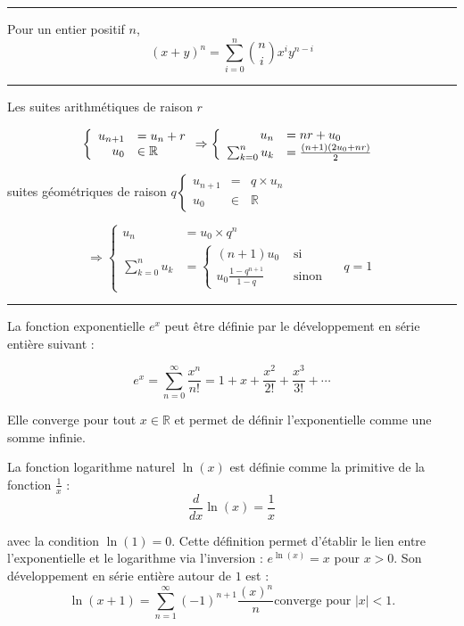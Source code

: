 \hrule
\begin{f}
	
	Pour un entier positif \(n\),
	\[
	(x+y)^n=\sum_{i=0}^n\binom{n}{i} x^i y^{n-i}
	\]
	
\end{f}
\hrule
\begin{f}[Suites]  
	
	Les suites arithmétiques de raison \(r\)
	
	\[
	\left\{\begin{array} { r l } 
		{ u _ { n + 1 } } & { = u _ { n } + r } \\
		{ u _ { 0 } } & { \in \mathbb { R } }
	\end{array} \Rightarrow \left\{\begin{array}{rl}
		u_n & =n r+u_0 \\
		\sum_{k=0}^n u_k & =\frac{(n+1)\left(2 u_0+n r\right)}{2}
	\end{array}\right.\right.
	\]
	
	suites géométriques de raison \(q\left\{\begin{array}{rll}u_{n+1} & = & q \times u_n \\ u_0 & \in & \mathbb{R}\end{array}\right.\)
	
	\[
	\Rightarrow\left\{\begin{array}{rlr}
		u_n & =u_0 \times q^n \\
		\sum_{k=0}^n u_k & =\left\{\begin{array}{rl}
			(n+1) u_0 & \text { si } \\
			u_0 \frac{1-q^{n+1}}{1-q} & \text { sinon }
		\end{array} \quad q=1\right.
	\end{array}\right.
	\]
	
\end{f}
\hrule
\begin{f}
	La fonction exponentielle \( e^x \) peut être définie par le développement en série entière suivant :
	
	\[
	e^x = \sum_{n=0}^{\infty} \frac{x^n}{n!} = 1 + x + \frac{x^2}{2!} + \frac{x^3}{3!} + \cdots
	\]
	
	Elle converge pour tout \( x \in \mathbb{R} \) et permet de définir l'exponentielle comme une somme infinie.
	
	
	La fonction logarithme naturel \( \ln(x) \) est définie comme la primitive de la fonction \( \frac{1}{x} \) :
	\[
	\frac{d}{dx} \ln(x) = \frac{1}{x}
	\]
	
	avec la condition \( \ln(1) = 0 \). Cette définition permet d'établir le lien entre l'exponentielle et le logarithme via l'inversion : \( e^{\ln(x)} = x \) pour \( x > 0 \).
	Son développement en série entière autour de \(1\) est : 
	\[
	 \ln(x+1) = \sum_{n=1}^{\infty} (-1)^{n+1}\frac{(x)^n}{n}%
	 \text{converge pour \(\lvert x\rvert < 1\).}
	 \] 
	
\end{f}



